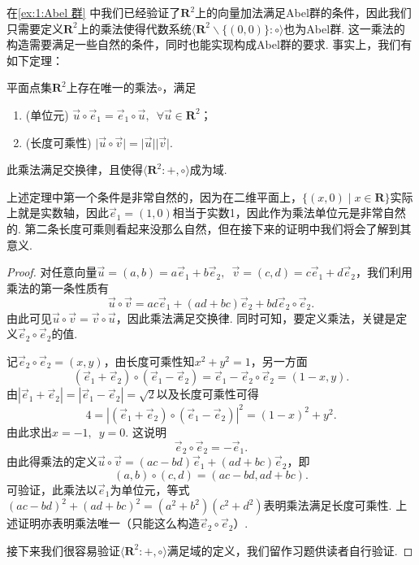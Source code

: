 在\autoref{ex:1:Abel 群} 中我们已经验证了$\mathbf{R}^2$上的向量加法满足Abel群的条件，因此我们只需要定义$\mathbf{R}^2$上的乘法使得代数系统$\langle\mathbf{R}^2\backslash\{(0,0)\}:\circ\rangle$也为Abel群. 这一乘法的构造需要满足一些自然的条件，同时也能实现构成Abel群的要求. 事实上，我们有如下定理：
\begin{theorem}\label{thm:1:复数乘法构造}
    平面点集$\mathbf{R}^2$上存在唯一的乘法$\circ$，满足
    \begin{enumerate}
        \item (单位元) $\vec{u}\circ\vec{e}_1=\vec{e}_1\circ\vec{u},\enspace\forall\vec{u}\in\mathbf{R}^2$；

        \item (长度可乘性) $\lvert\vec{u}\circ\vec{v}\rvert=\lvert\vec{u}\rvert\lvert\vec{v}\rvert$.
    \end{enumerate}
    此乘法满足交换律，且使得$\langle\mathbf{R}^2:+,\circ\rangle$成为域.
\end{theorem}

上述定理中第一个条件是非常自然的，因为在二维平面上，$\{(x,0) \mid x\in\mathbf{R}\}$实际上就是实数轴，因此$\vec{e}_1=(1,0)$相当于实数1，因此作为乘法单位元是非常自然的. 第二条长度可乘则看起来没那么自然，但在接下来的证明中我们将会了解到其意义.

\begin{proof}
    对任意向量$\vec{u}=(a,b)=a\vec{e}_1+b\vec{e}_2,\enspace \vec{v}=(c,d)=c\vec{e}_1+d\vec{e}_2$，我们利用乘法的第一条性质有
    \[\vec{u}\circ\vec{v}=ac\vec{e}_1+(ad+bc)\vec{e}_2+bd\vec{e}_2\circ\vec{e}_2.\]
    由此可见$\vec{u}\circ\vec{v}=\vec{v}\circ\vec{u}$，因此乘法满足交换律. 同时可知，要定义乘法，关键是定义$\vec{e}_2\circ\vec{e}_2$的值.

    记$\vec{e}_2\circ\vec{e}_2=(x,y)$，由长度可乘性知$x^2+y^2=1$，另一方面
    \[(\vec{e}_1+\vec{e}_2)\circ(\vec{e}_1-\vec{e}_2)=\vec{e}_1-\vec{e}_2\circ\vec{e}_2=(1-x,y).\]
    由$|\vec{e}_1+\vec{e}_2|=|\vec{e}_1-\vec{e}_2|=\sqrt{2}$以及长度可乘性可得
    \[4=|(\vec{e}_1+\vec{e}_2)\circ(\vec{e}_1-\vec{e}_2)|^2=(1-x)^2+y^2.\]
    由此求出$x=-1,\enspace y=0$. 这说明
    \[\vec{e}_2\circ\vec{e}_2=-\vec{e}_1.\]
    由此得乘法的定义$\vec{u}\circ\vec{v}=(ac-bd)\vec{e}_1+(ad+bc)\vec{e}_2$，即
    \[(a,b)\circ(c,d)=(ac-bd,ad+bc).\]
    可验证，此乘法以$\vec{e}_1$为单位元，等式$(ac-bd)^2+(ad+bc)^2=(a^2+b^2)(c^2+d^2)$表明乘法满足长度可乘性. 上述证明亦表明乘法唯一（只能这么构造$\vec{e}_2\circ\vec{e}_2$）.

    接下来我们很容易验证$\langle\mathbf{R}^2:+,\circ\rangle$满足域的定义，我们留作习题供读者自行验证.
\end{proof}

